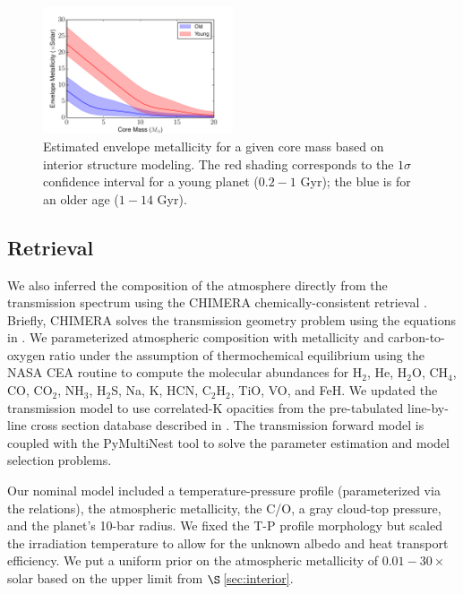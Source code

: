 \documentclass[twocolumn, trackchanges]{aastex61}
\begin{document}
\begin{figure}
\includegraphics[width = 0.5\textwidth]{Figures/fig3_metallicity.pdf}
\caption{Estimated envelope metallicity for a given core mass based on interior structure modeling. The red shading corresponds to the $1\sigma$ confidence interval for a young planet ($0.2-1$ Gyr); the blue is for an older age ($1-14$ Gyr).}
\label{fig:metal_prior}
\end{figure}

\subsection{Retrieval}
\label{sec:retrieval}
We also inferred the composition of the atmosphere directly from the transmission spectrum using the CHIMERA chemically-consistent retrieval \citep{line13a}.   Briefly, CHIMERA solves the transmission geometry problem using the equations in \cite{brown01, tinetti12}.  We parameterized atmospheric composition with metallicity and carbon-to-oxygen ratio under the assumption of thermochemical equilibrium using the NASA CEA routine \citep{gordon94} to compute the molecular abundances for H$_2$, He, H$_2$O, CH$_4$, CO, CO$_2$, NH$_3$, H$_2$S, Na, K, HCN, C$_2$H$_2$, TiO, VO, and FeH.    We updated the transmission model to use correlated-K opacities \citep{lacis91, molliere15, amundsen16} from the pre-tabulated line-by-line cross section database described in \cite{freedman14}. The transmission forward model is coupled with the PyMultiNest tool \citep{buchner16} to solve the parameter estimation and model selection problems.  

Our nominal model included a temperature-pressure profile (parameterized via the \citealt{guillot10} relations), the atmospheric metallicity, the C/O, a gray cloud-top pressure, and the planet's 10-bar radius.  We fixed the T-P profile morphology but scaled the irradiation temperature to allow for the unknown albedo and heat transport efficiency.  We put a uniform prior on the atmospheric metallicity of $0.01 - 30\times$ solar based on the upper limit from $\S$\,\ref{sec:interior}.  
\end{document}
